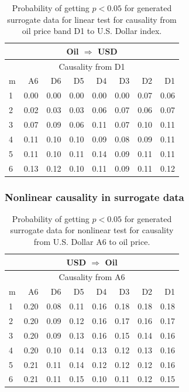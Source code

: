 %
%
\begin{table}[H]
\begin{center}
\begin{tabular}{l|r r r r r r r}
\hline\hline
\multicolumn{8}{c}{Oil $\Rightarrow$ USD}\\
\hline
\multicolumn{8}{c}{Causality from D1}\\
\hline\hline
m & A6 & D6 & D5 & D4 & D3 & D2 & D1 \\
\hline
1 & 0.00 & 0.00 & 0.00 & 0.00 & 0.00 & 0.07 & 0.06 \\
2 & 0.02 & 0.03 & 0.03 & 0.06 & 0.07 & 0.06 & 0.07 \\
3 & 0.07 & 0.09 & 0.06 & 0.11 & 0.07 & 0.10 & 0.11 \\
4 & 0.11 & 0.10 & 0.10 & 0.09 & 0.08 & 0.09 & 0.11 \\
5 & 0.11 & 0.10 & 0.11 & 0.14 & 0.09 & 0.11 & 0.11 \\
6 & 0.13 & 0.12 & 0.10 & 0.11 & 0.09 & 0.11 & 0.12 \\
\hline\hline
\end{tabular}
\caption{Probability of getting $p < 0.05$ for generated surrogate data for linear test for causality from oil price band D1 to U.S. Dollar index.}
\end{center}
\end{table}

\subsubsection{Nonlinear causality in surrogate data}
%
%
\begin{table}[H]
\begin{center}
\begin{tabular}{l|r r r r r r r}
\hline\hline
\multicolumn{8}{c}{USD $\Rightarrow$ Oil}\\
\hline
\multicolumn{8}{c}{Causality from A6}\\
\hline\hline
m & A6 & D6 & D5 & D4 & D3 & D2 & D1 \\
\hline
1 & 0.20 & 0.08 & 0.11 & 0.16 & 0.18 & 0.18 & 0.18 \\
2 & 0.20 & 0.09 & 0.12 & 0.16 & 0.17 & 0.16 & 0.17 \\
3 & 0.20 & 0.09 & 0.13 & 0.16 & 0.15 & 0.14 & 0.16 \\
4 & 0.20 & 0.10 & 0.14 & 0.13 & 0.12 & 0.13 & 0.16 \\
5 & 0.21 & 0.11 & 0.14 & 0.12 & 0.12 & 0.12 & 0.16 \\
6 & 0.21 & 0.11 & 0.15 & 0.10 & 0.11 & 0.12 & 0.15 \\
\hline\hline
\end{tabular}
\caption{Probability of getting $p < 0.05$ for generated surrogate data for nonlinear test for causality from U.S. Dollar A6 to oil price.}
\end{center}
\end{table}


